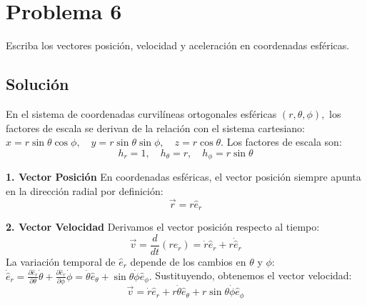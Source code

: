 \documentclass[a4paper]{article}
\begin{document}
\section{Problema 6}
Escriba los vectores posición, velocidad y aceleración en coordenadas esféricas.

\subsection{Solución}

En el sistema de coordenadas curvilíneas ortogonales esféricas $(r, \theta, \phi),$ los factores de escala se derivan de la relación con el sistema cartesiano:
$x = r \sin\theta \cos\phi, \quad y = r \sin\theta \sin\phi, \quad z = r \cos\theta.$
Los factores de escala son:
\begin{equation}
h_r = 1, \quad h_\theta = r, \quad h_\phi = r \sin\theta
\end{equation}

\textbf{1. Vector Posición}
En coordenadas esféricas, el vector posición siempre apunta en la dirección radial por definición:
\begin{equation}
\vec{r} = r \hat{e}_r
\end{equation}

\textbf{2. Vector Velocidad}
Derivamos el vector posición respecto al tiempo:
\begin{equation}
\vec{v} = \frac{d}{dt} (r \hat{e}_r) = \dot{r} \hat{e}_r + r \dot{\hat{e}}_r
\end{equation}
La variación temporal de $\hat{e}_r$ depende de los cambios en $\theta$ y $\phi:$
$\dot{\hat{e}}_r = \frac{\partial \hat{e}_r}{\partial \theta} \dot{\theta} + \frac{\partial \hat{e}_r}{\partial \phi} \dot{\phi} = \dot{\theta} \hat{e}_\theta + \sin\theta \dot{\phi} \hat{e}_\phi.$
Sustituyendo, obtenemos el vector velocidad:
\begin{equation}
\vec{v} = \dot{r} \hat{e}_r + r \dot{\theta} \hat{e}_\theta + r \sin\theta \dot{\phi} \hat{e}_\phi
\end{equation}
\end{document}
